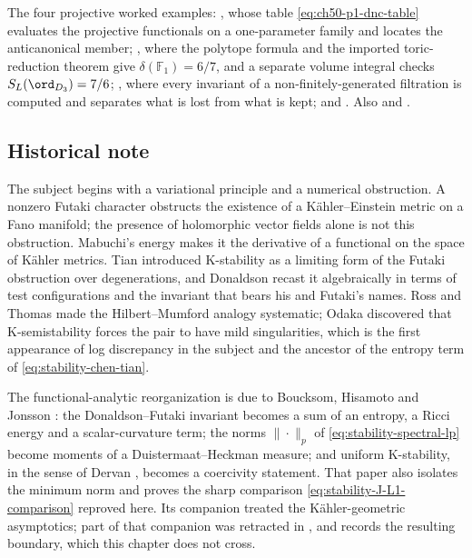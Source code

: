 The four projective worked examples:
, whose table \eqref{eq:ch50-p1-dnc-table} evaluates
the projective functionals on a one-parameter family and locates the
anticanonical member;
, where the polytope formula and the imported
toric-reduction theorem give $\delta(\mathbb F_1)=6/7$, and a separate
volume integral checks $S_L(\ord_{D_3})=7/6$;
, where every invariant of a
non-finitely-generated filtration is computed and
 separates what is lost from what is
kept; and .  Also
 and .

\subsection{Historical note}
\label{sec:ch50-history}

The subject begins with a variational principle and a numerical
obstruction.  A nonzero Futaki character \cite{Fut83} obstructs the
existence of a K\"ahler--Einstein metric on a Fano manifold; the presence
of holomorphic vector fields alone is not this obstruction.  Mabuchi's energy \cite{Mab87} makes it the derivative of a
functional on the space of K\"ahler metrics.  Tian \cite{Tia97} introduced
K-stability as a limiting form of the Futaki obstruction over
degenerations, and Donaldson \cite{Don02} recast it algebraically in terms
of test configurations and the invariant that bears his and Futaki's names.
Ross and Thomas \cite{RT07} made the Hilbert--Mumford analogy systematic;
Odaka \cite{Od13,Od13b} discovered that K-semistability forces the pair to
have mild singularities, which is the first appearance of log discrepancy
in the subject and the ancestor of the entropy term of
\eqref{eq:stability-chen-tian}.

The functional-analytic reorganization is due to Boucksom, Hisamoto and
Jonsson \cite{BHJ17}: the Donaldson--Futaki invariant becomes a sum of an
entropy, a Ricci energy and a scalar-curvature term; the norms
$\|\cdot\|_p$ of \eqref{eq:stability-spectral-lp} become moments of a
Duistermaat--Heckman measure; and uniform K-stability, in the sense of
Dervan \cite{Der16}, becomes a coercivity statement.  That paper also
isolates the minimum norm and proves the sharp comparison
\eqref{eq:stability-J-L1-comparison} reproved here.  Its companion
\cite{BHJ19} treated the K\"ahler-geometric asymptotics; part of that
companion was retracted in \cite{BHJ19err}, and
 records the resulting boundary, which
this chapter does not cross.


